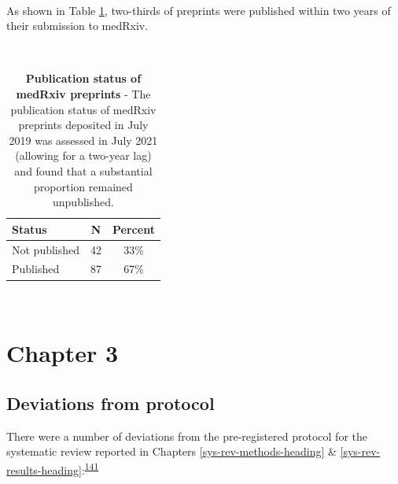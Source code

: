 \documentclass[a4paper, twoside]{templates/ociamthesis}
\begin{document}
~

As shown in Table \ref{tab:medRes-table}, two-thirds of preprints were published within two years of their submission to medRxiv.

~





\begin{table}[H]

\caption[Publication status of medRxiv preprints]{\label{tab:medRes-table}\textbf{Publication status of medRxiv preprints} - The publication status of medRxiv preprints deposited in July 2019 was assessed in July 2021 (allowing for a two-year lag) and found that a substantial proportion remained unpublished.}
\centering
\begin{tabular}[t]{lcc}
\toprule
\textbf{Status} & \textbf{N} & \textbf{Percent}\\
\midrule
Not published & 42 & 33\%\\
Published & 87 & 67\%\\
\bottomrule
\end{tabular}
\end{table}

~

\hypertarget{appendix-sys-rev}{%
\section{Chapter 3}\label{appendix-sys-rev}}

\hypertarget{appendix-sys-rev-deviations}{%
\subsection{Deviations from protocol}\label{appendix-sys-rev-deviations}}

There were a number of deviations from the pre-registered protocol for the systematic review reported in Chapters \ref{sys-rev-methods-heading} \& \ref{sys-rev-results-heading}:\textsuperscript{\protect\hyperlink{ref-mcguinnessluke2020}{141}}
\end{document}
